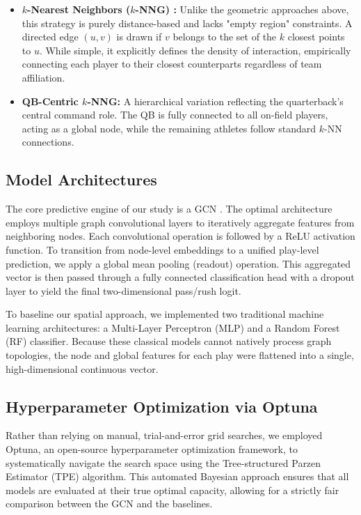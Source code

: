\documentclass[runningheads]{llncs}
\begin{document}
\begin{itemize}
    \item \textbf{$k$-Nearest Neighbors ($k$-NNG) \cite{cover1967nearest,fukunaga1975estimation}:} Unlike the geometric approaches above, this strategy is purely distance-based and lacks "empty region" constraints. A directed edge $(u, v)$ is drawn if $v$ belongs to the set of the $k$ closest points to $u$. While simple, it explicitly defines the density of interaction, empirically connecting each player to their closest counterparts regardless of team affiliation.

    \item \textbf{QB-Centric $k$-NNG:} A hierarchical variation reflecting the quarterback's central command role. The QB is fully connected to all on-field players, acting as a global node, while the remaining athletes follow standard $k$-NN connections.
\end{itemize}

\subsection{Model Architectures}
\label{subsec:architectures}

The core predictive engine of our study is a GCN \cite{Kipf2016}. The optimal architecture employs multiple graph convolutional layers to iteratively aggregate features from neighboring nodes. Each convolutional operation is followed by a ReLU activation function. To transition from node-level embeddings to a unified play-level prediction, we apply a global mean pooling (readout) operation. This aggregated vector is then passed through a fully connected classification head with a dropout layer to yield the final two-dimensional pass/rush logit.

To baseline our spatial approach, we implemented two traditional machine learning architectures: a Multi-Layer Perceptron (MLP) and a Random Forest (RF) classifier. Because these classical models cannot natively process graph topologies, the node and global features for each play were flattened into a single, high-dimensional continuous vector. 

\subsection{Hyperparameter Optimization via Optuna}
\label{subsec:optuna_optimization}

Rather than relying on manual, trial-and-error grid searches, we employed Optuna, an open-source hyperparameter optimization framework, to systematically navigate the search space using the Tree-structured Parzen Estimator (TPE) algorithm. This automated Bayesian approach ensures that all models are evaluated at their true optimal capacity, allowing for a strictly fair comparison between the GCN and the baselines.
\end{document}

